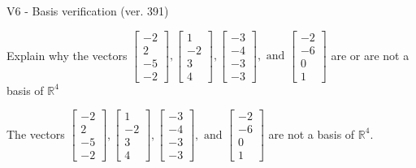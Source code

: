 \begin{exercise}
  \begin{exerciseTitle}V6 - Basis verification (ver. 391)\end{exerciseTitle}
  \begin{exerciseStatement}
    Explain why the vectors \(\left[\begin{array}{r}
-2 \\
2 \\
-5 \\
-2
\end{array}\right] , \left[\begin{array}{r}
1 \\
-2 \\
3 \\
4
\end{array}\right] , \left[\begin{array}{r}
-3 \\
-4 \\
-3 \\
-3
\end{array}\right] , \text{ and } \left[\begin{array}{r}
-2 \\
-6 \\
0 \\
1
\end{array}\right]\) are or are not a basis of \(\mathbb{R}^4\)	


  \end{exerciseStatement}
  \begin{exerciseAnswer}
   The vectors \(\left[\begin{array}{r}
-2 \\
2 \\
-5 \\
-2
\end{array}\right] , \left[\begin{array}{r}
1 \\
-2 \\
3 \\
4
\end{array}\right] , \left[\begin{array}{r}
-3 \\
-4 \\
-3 \\
-3
\end{array}\right] , \text{ and } \left[\begin{array}{r}
-2 \\
-6 \\
0 \\
1
\end{array}\right]\) 
  	 are not  a basis of \(\mathbb{R}^4\).
  


  \end{exerciseAnswer}
\end{exercise}